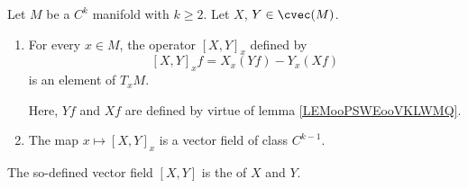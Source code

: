 \begin{propositionDef}      \label{DEFooHOTOooRaPwyo}
	Let \( M\) be a \( C^k\) manifold with \( k\geq 2\). Let $X$, $Y\in\cvec(M)$.
	\begin{enumerate}
		\item       \label{ITEMooZKKUooQjYftU}
		      For every \( x\in M\), the operator \( [X,Y]_x\) defined by
		      \begin{equation}        \label{EQooDSKWooXdjPPP}
			      [X,Y]_xf=X_x(Yf)-Y_x(Xf)
		      \end{equation}
		      is an element of \( T_xM\).

		      Here, \( Yf\) and \( Xf\) are defined by virtue of lemma \ref{LEMooPSWEooVKLWMQ}.
		\item       \label{ITEMooPGPLooQrKxWY}
		      The map \( x\mapsto [X,Y]_x\) is a vector field of class \( C^{k-1}\).
	\end{enumerate}

	The so-defined vector field \( [X,Y]\) is the  of \( X\) and \( Y\).
\end{propositionDef}

